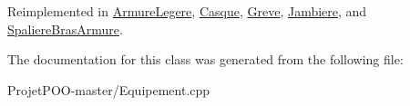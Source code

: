 \-Reimplemented in \hyperlink{class_armure_legere_a827399af549f7fd182c9ff96be61a4d0}{\-Armure\-Legere}, \hyperlink{class_casque_a7d4eee2cf255fbbac8d308560e572c57}{\-Casque}, \hyperlink{class_greve_ab5cabb1d422d0af2d15f733ecbe3af41}{\-Greve}, \hyperlink{class_jambiere_ac13c334f7999987cd1437687bb5ad4d4}{\-Jambiere}, and \hyperlink{class_spaliere_bras_armure_ac7c03928bacb86e6ff9a6743ed46cb16}{\-Spaliere\-Bras\-Armure}.



\-The documentation for this class was generated from the following file\-:\begin{DoxyCompactItemize}
\item 
\-Projet\-P\-O\-O-\/master/\-Equipement.\-cpp\end{DoxyCompactItemize}
